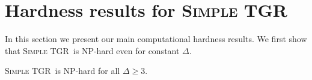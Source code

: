 \documentclass[a4paper,UKenglish,cleveref, autoref, thm-restate,anonymous]{lipics-v2021}
\newcommand{\NP}{\textrm{NP}}
\newcommand{\deltaExact}{\textsc{Simple TGR}}
\begin{document}
\section{Hardness results for \deltaExact}  
In this section we present our main computational hardness results.  
We first show that \deltaExact\ is NP-hard even for constant $\Delta$. 


\begin{theorem}[$\star$]\label{thm:NPhardness}
	\deltaExact\ is \NP-hard for all $\Delta \geq 3$.
\end{theorem}
\end{document}
